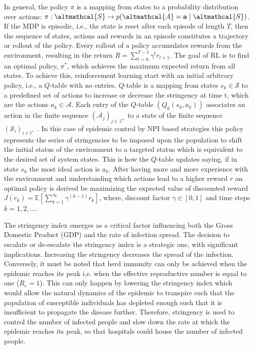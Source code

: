 \documentclass[tikz,fleqn,12pt]{wlscirep}
\begin{document}
In general, the policy $\pi$ is a mapping from states to a probability distribution over actions: $\pi: \altmathcal{S} \rightarrow p(\altmathcal{A}=\mathbf{a} \mid \altmathcal{S})$. If the MDP is episodic, i.e., the state is reset after each episode of length $T$, then the sequence of states, actions and rewards in an episode constitutes a trajectory or rollout of the policy. Every rollout of a policy accumulates rewards from the environment, resulting in the return $R=\sum_{t=0}^{T-1} \gamma^t r_{t+1}$. The goal of RL is to find an optimal policy, $\pi^*$, which achieves the maximum expected return from all states. To achieve this, reinforcement learning start with an initial arbitrary policy, i.e., a $Q$-table with no entries. $Q$-table is a mapping from states $s_k \in \mathscr{S}$ to a predefined set of actions to increase or decrease the stringency at time t, which are the actions $a_k \in \mathscr{A}$. Each entry of the $Q$-table $\left(Q_k\left(s_k, a_k\right)\right)$ associates an action in the finite sequence $\left(\mathscr{A}_j\right)_{j \in \mathbb{J}^{+}}$ to a state of the finite sequence $\left(\mathscr{S}_i\right)_{i \in \mathbb{I}^{+}}$ \cite{sutton2018reinforcement}. In this case of epidemic control by NPI based strategies this policy represents the series of stringencies to be imposed upon the population to shift the initial status of the environment to a targeted status which is equivalent to the desired set of system states. This is how the $Q$-table updates saying, if in state $s_k$ the most ideal action is $a_k$. After having more and more experience with the environment and understanding which actions lead to a higher reward $r$ an optimal policy is derived be maximizing the expected value of discounted reward $J\left(r_k\right)=\mathbb{E}\left[\sum_{k=1}^{\infty} \gamma^{(k-1)} r_k\right]$, where, discount factor $\gamma \in [0, 1]$ and time steps $k = 1, 2, \dots$.

The stringency index emerges as a critical factor influencing both the Gross Domestic Product (GDP) and the rate of infection spread. The decision to escalate or de-escalate the stringency index is a strategic one, with significant implications. Increasing the stringency decreases the spread of the infection. Conversely, it must be noted that herd immunity can only be achieved when the epidemic reaches its peak i.e. when the effective reproductive number is equal to one ($R_e = 1$). This can only happen by lowering the stringency index which would allow the natural dynamics of the epidemic to transpire such that the population of susceptible individuals has depleted enough such that it is insufficient to propagate the disease further. Therefore, stringency is used to control the number of infected people and slow down the rate at which the epidemic reaches its peak, so that hospitals could house the number of infected people.
\end{document}
